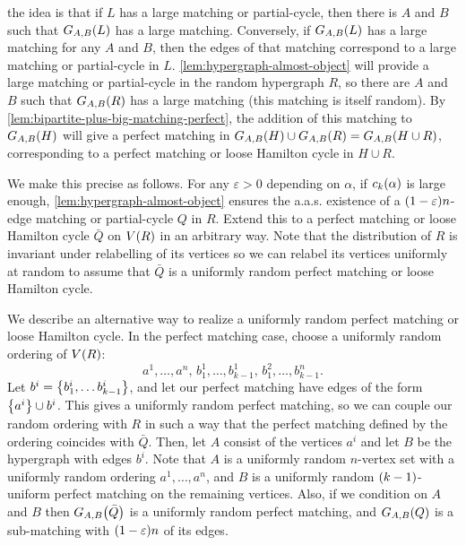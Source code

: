 \documentclass[11pt,english]{article}
\theoremstyle{plain}
\theoremstyle{definition}
\theoremstyle{definition}
\theoremstyle{plain}
\theoremstyle{plain}
\theoremstyle{plain}
\theoremstyle{plain}
\theoremstyle{remark}
\theoremstyle{remark}
\let\originalleft\left
\let\originalright\right
\renewcommand{\left}{\mathopen{}\mathclose\bgroup\originalleft}
\renewcommand{\right}{\aftergroup\egroup\originalright}
\begin{document}
the idea is that if $L$ has a large matching or partial-cycle, then there
is $A$ and $B$ such that $G_{A,B}\left(L\right)$ has a large matching. Conversely,
if $G_{A,B}\left(L\right)$ has a large matching for any $A$
and $B$, then the edges of that matching correspond to a large matching or partial-cycle in $L$. \ref{lem:hypergraph-almost-object}
will provide a large matching or partial-cycle in the random hypergraph $R$, so there are $A$
and $B$ such that $G_{A,B}\left(R\right)$ has a large matching (this matching is itself random).
By \ref{lem:bipartite-plus-big-matching-perfect}, the addition of
this matching to $G_{A,B}\left(H\right)$ will give a perfect
matching in $G_{A,B}\left(H\right)\cup G_{A,B}\left(R\right)=G_{A,B}\left(H\cup R\right)$,
corresponding to a perfect matching or loose Hamilton cycle in $H\cup R$.

We make this precise as follows. For any $\varepsilon>0$ depending on $\alpha$, if $\chyp\left(\alpha\right)$
is large enough, \ref{lem:hypergraph-almost-object} ensures the a.a.s.
existence of a $\left(1-\varepsilon\right)n$-edge matching or partial-cycle $Q$ in $R$. Extend this to a perfect matching or loose Hamilton cycle
$\bar{Q}$ on $V\left(R\right)$ in an arbitrary way. Note that the distribution of $R$
is invariant under relabelling of its vertices so we can relabel its
vertices uniformly at random to assume that $\bar{Q}$ is a uniformly
random perfect matching or loose Hamilton cycle.

We describe an alternative way to realize a uniformly random perfect
matching or loose Hamilton cycle. In the perfect matching case, choose a
uniformly random ordering of $V\left(R\right)$: 
\[
a^{1},\dots,a^{n},\, b_{1}^{1},\dots,b_{k-1}^{1},\, b_{1}^{2},\dots,b_{k-1}^{n}.
\]
Let $b^{i}=\left\{ b_{1}^{i},\dots b_{k-1}^{i}\right\}$, and let our perfect matching have edges of the form $\left\{a^{i}\right\}\cup b^i $.
This gives a uniformly random perfect matching, so we can couple our
random ordering with $R$ in such a way that the perfect matching
defined by the ordering coincides with $\bar{Q}$. Then, let $A$
consist of the vertices $a^{i}$ and let $B$ be the hypergraph with
edges $b^i$.
Note that $A$ is a uniformly random $n$-vertex set with a uniformly random ordering $a^{1},\dots,a^{n}$, and $B$ is a
uniformly random $\left(k-1\right)$-uniform perfect matching on the remaining vertices. Also,
if we condition on $A$ and $B$ then $G_{A,B}\left(\bar{Q}\right)$
is a uniformly random perfect matching, and $G_{A,B}\left(Q\right)$
is a sub-matching with $\left(1-\varepsilon\right)n$ of its edges.
\end{document}
